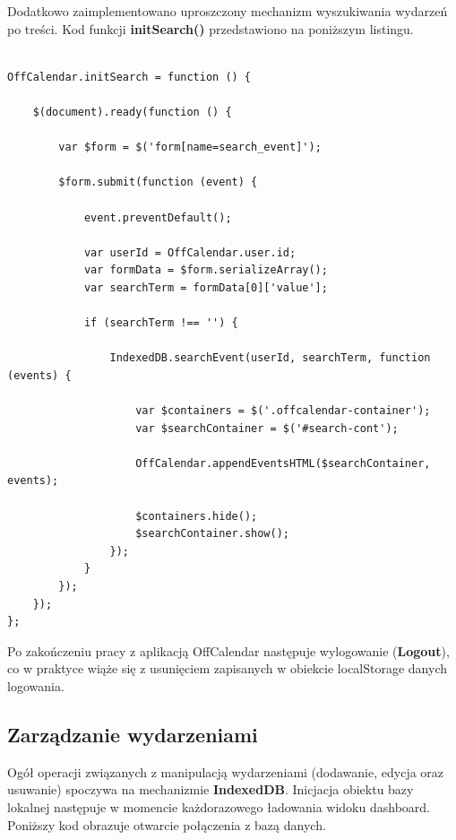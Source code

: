 Dodatkowo zaimplementowano uproszczony mechanizm wyszukiwania wydarzeń po treści. Kod funkcji \textbf{initSearch()} przedstawiono na poniższym listingu.

\begin{lstlisting}[caption=Wyszukiwanie wydarzeń w oparciu o treść., label=amb, captionpos=b]

OffCalendar.initSearch = function () {

    $(document).ready(function () {
    
        var $form = $('form[name=search_event]');

        $form.submit(function (event) {

            event.preventDefault();

            var userId = OffCalendar.user.id;
            var formData = $form.serializeArray();
            var searchTerm = formData[0]['value'];

            if (searchTerm !== '') {

                IndexedDB.searchEvent(userId, searchTerm, function (events) {

                    var $containers = $('.offcalendar-container');
                    var $searchContainer = $('#search-cont');

                    OffCalendar.appendEventsHTML($searchContainer, events);

                    $containers.hide();
                    $searchContainer.show();
                });
            }
        });
    });
};

\end{lstlisting}

Po zakończeniu pracy z aplikacją OffCalendar następuje wylogowanie (\textbf{Logout}), co w praktyce wiąże się z usunięciem zapisanych w obiekcie localStorage danych logowania.

\subsection{Zarządzanie wydarzeniami}
\label{sec:zarzWyd}

Ogół operacji związanych z manipulacją wydarzeniami (dodawanie, edycja oraz usuwanie) spoczywa na mechanizmie \textbf{IndexedDB}. Inicjacja obiektu bazy lokalnej następuje w momencie każdorazowego ładowania widoku dashboard. Poniższy kod obrazuje otwarcie połączenia z bazą danych.

